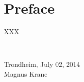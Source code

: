 \section*{Preface}

		XXX


\mbox{}\\[10pc]
\begin{center}
Trondheim, July 02, 2014\\[1pc]
\vspace{15 mm}
Magnus Krane
\end{center}

\clearpage
